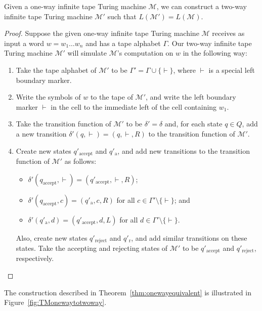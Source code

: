 \begin{theorem}\label{thm:onewayequivalent}
Given a one-way infinite tape Turing machine $\mathcal{M}$, we can construct a two-way infinite tape Turing machine $\mathcal{M}'$ such that $L(\mathcal{M}') = L(\mathcal{M})$.

\begin{proof}
Suppose the given one-way infinite tape Turing machine $\mathcal{M}$ receives as input a word $w = w_{1} \dots w_{n}$ and has a tape alphabet $\Gamma$. Our two-way infinite tape Turing machine $\mathcal{M}'$ will simulate $\mathcal{M}$'s computation on $w$ in the following way:
\begin{enumerate}
\item Take the tape alphabet of $\mathcal{M}'$ to be $\Gamma' = \Gamma \cup \{\vdash\}$, where $\vdash$ is a special left boundary marker.
\item Write the symbols of $w$ to the tape of $\mathcal{M}'$, and write the left boundary marker $\vdash$ in the cell to the immediate left of the cell containing $w_{1}$.
\item Take the transition function of $\mathcal{M}'$ to be $\delta' = \delta$ and, for each state $q \in Q$, add a new transition $\delta'(q, \vdash) = (q, \vdash, R)$ to the transition function of $\mathcal{M}'$.
\item Create new states $q'_{\text{accept}}$ and $q'_{\text{a}}$, and add new transitions to the transition function of $\mathcal{M}'$ as follows:
	\begin{itemize}
	\item $\delta'(q_{\text{accept}}, \vdash) = (q'_{\text{accept}}, \vdash, R)$;
	\item $\delta'(q_{\text{accept}}, c) = (q'_{\text{a}}, c, R)$ for all $c \in \Gamma' \setminus \{\vdash\}$; and
	\item $\delta'(q'_{\text{a}}, d) = (q'_{\text{accept}}, d, L)$ for all $d \in \Gamma' \setminus \{\vdash\}$.
	\end{itemize}
Also, create new states $q'_{\text{reject}}$ and $q'_{\text{r}}$, and add similar transitions on these states. Take the accepting and rejecting states of $\mathcal{M}'$ to be $q'_{\text{accept}}$ and $q'_{\text{reject}}$, respectively. \qedhere
\end{enumerate}
\end{proof}
\end{theorem}

The construction described in Theorem~\ref{thm:onewayequivalent} is illustrated in Figure~\ref{fig:TMonewaytotwoway}.

